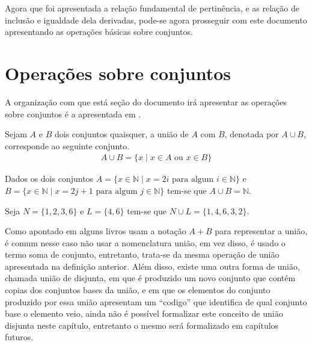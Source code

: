 Agora que foi apresentada a relação fundamental de pertinência, e as relação de inclusão e igualdade dela derivadas, pode-se agora prosseguir com este documento apresentando as operações básicas sobre conjuntos.

\section{Operações sobre conjuntos}\label{sec:OperacaoSobreConjuntos}

A organização com que está seção do documento irá apresentar as operações sobre conjuntos é a apresentada em \cite{lipschutz2013-MD}.

\begin{definicao}\label{def:UniaoConjuntos}
  Sejam $A$ e $B$ dois conjuntos quaisquer, a união de $A$ com $B$, denotada por $A \cup B$, corresponde ao seguinte conjunto.
  \begin{eqnarray*}
    A \cup B = \{x \mid x \in A \mbox{ ou } x \in B\}
  \end{eqnarray*}
\end{definicao}

\begin{exemplo}\label{exe:UniaoConjuntos1}
  Dados os dois conjuntos $A = \{x \in \mathbb{N} \mid x = 2i \mbox{ para algum } i \in \mathbb{N}\}$ e $B = \{x \in \mathbb{N} \mid x = 2j + 1 \mbox{ para algum } j \in \mathbb{N}\}$ tem-se que $A \cup B = \mathbb{N}$.
\end{exemplo}

\begin{exemplo}\label{exe:UniaoConjuntos2}
  Seja $N = \{1, 2, 3, 6\}$ e $L = \{4, 6\}$ tem-se que $N \cup L = \{1, 4, 6, 3, 2\}$.
\end{exemplo}

Como apontado em \cite{lipschutz1978-TC} alguns livros usam a notação $A + B$ para representar a união, é comum nesse caso não usar a nomenclatura união, em vez disso, é usado o termo soma de conjunto, entretanto, trata-se da mesma operação de união apresentada na definição anterior. Além disso, existe uma outra forma de união, chamada união de disjunta, em que é produzido um novo conjunto que contém copias dos conjuntos bases da união, e em que os elementos do conjunto produzido por essa união apresentam um ``codigo'' que identifica de qual conjunto base o elemento veio, ainda não é possível formalizar este conceito de união disjunta neste capítulo, entretanto o mesmo será formalizado em capítulos futuros.


